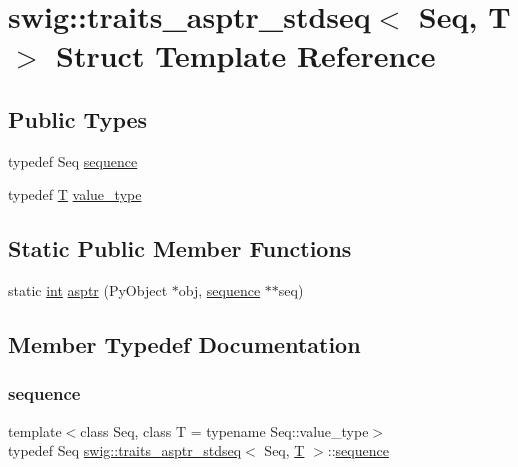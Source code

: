 \hypertarget{structswig_1_1traits__asptr__stdseq}{}\section{swig\+:\+:traits\+\_\+asptr\+\_\+stdseq$<$ Seq, T $>$ Struct Template Reference}
\label{structswig_1_1traits__asptr__stdseq}
\subsection*{Public Types}
\begin{DoxyCompactItemize}
\item 
typedef Seq \hyperlink{structswig_1_1traits__asptr__stdseq_acc3237a1f41e649f169c938930068a35}{sequence}
\item 
typedef \hyperlink{fmt_8h_a0acb682b8260ab1c60b918599864e2e5}{T} \hyperlink{structswig_1_1traits__asptr__stdseq_a18bb424b58bc29aa995ff6d246499ee5}{value\+\_\+type}
\end{DoxyCompactItemize}
\subsection*{Static Public Member Functions}
\begin{DoxyCompactItemize}
\item 
static \hyperlink{lp__lib_8h_adeb9ec6400320e4923ac9d836d509ddb}{int} \hyperlink{structswig_1_1traits__asptr__stdseq_a20c63611de0e0b36a51bf9b1ff41af48}{asptr} (Py\+Object $\ast$obj, \hyperlink{structswig_1_1traits__asptr__stdseq_acc3237a1f41e649f169c938930068a35}{sequence} $\ast$$\ast$seq)
\end{DoxyCompactItemize}


\subsection{Member Typedef Documentation}
\mbox{\label{structswig_1_1traits__asptr__stdseq_acc3237a1f41e649f169c938930068a35}} 
\subsubsection{\texorpdfstring{sequence}{sequence}}
{\footnotesize\ttfamily template$<$class Seq, class T = typename Seq\+::value\+\_\+type$>$ \\
typedef Seq \hyperlink{structswig_1_1traits__asptr__stdseq}{swig\+::traits\+\_\+asptr\+\_\+stdseq}$<$ Seq, \hyperlink{fmt_8h_a0acb682b8260ab1c60b918599864e2e5}{T} $>$\+::\hyperlink{structswig_1_1traits__asptr__stdseq_acc3237a1f41e649f169c938930068a35}{sequence}}

